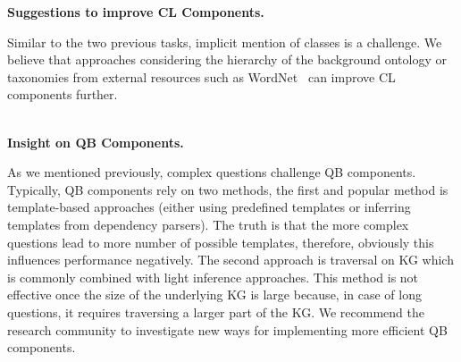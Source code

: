 \documentclass[sigconf,edbt]{acmart-edbt2019}
\newcommand{\qq}[1]{``#1''}
\begin{document}
{\bf Suggestions to improve CL Components.} \begin{inparaenum} 
Similar to the two previous tasks, implicit mention of classes is a challenge.
We believe that approaches considering the hierarchy of the background ontology or taxonomies from external resources such as WordNet~\cite{DBLP:journals/cacm/Miller95} can improve CL components further.
\end{inparaenum}
~\\
{\bf Insight on QB Components.} \begin{inparaenum} 
As we mentioned previously, complex questions challenge QB components.
Typically, QB components rely on two methods, the first and popular method is template-based approaches (either using predefined templates or inferring templates from dependency parsers). The truth is that the more complex questions lead to more number of possible templates, therefore, obviously this influences performance negatively.
The second approach is traversal on KG which is commonly combined with light inference approaches. This method is not effective once the size of the underlying KG is large because, in case of long questions, it requires traversing a larger part of the KG. We recommend the research community to investigate new ways for implementing more efficient QB components.
\end{inparaenum}
\end{document}
